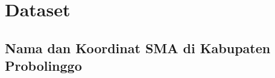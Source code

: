 \newpage
\thispagestyle{empty}
\appendix
\renewcommand{\thechapter}{\arabic{chapter}}
\chapter{Dataset}
\section{Nama dan Koordinat SMA di Kabupaten Probolinggo}
\label{lampiran1}








